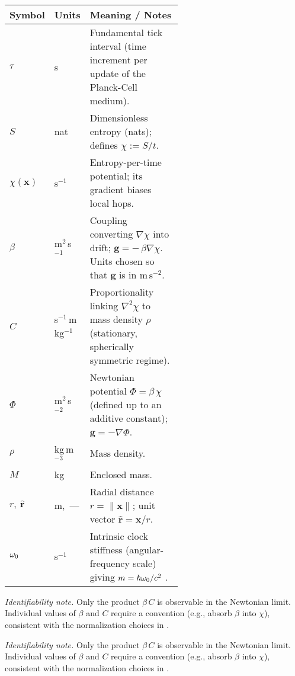 \documentclass[11pt,oneside]{article}
\begin{document}
\begin{table}[!htbp]
\centering
\small
\renewcommand{\arraystretch}{1.2}
\begin{tabular}{@{} l l >{\raggedright\arraybackslash}p{0.58\linewidth} @{}}
\hline
\textbf{Symbol} & \textbf{Units} & \textbf{Meaning / Notes} \\
\hline
$\tau$ & s & Fundamental tick interval (time increment per update of the Planck-Cell medium). \\
$S$ & nat & Dimensionless entropy (nats); defines $\chi:=S/t$. \\
$\chi(\mathbf x)$ & s$^{-1}$ & Entropy-per-time potential; its gradient biases local hops. \\
$\beta$ & m$^{2}$\,s$^{-1}$ & Coupling converting $\nabla\chi$ into drift; $\mathbf g=-\,\beta\nabla\chi$. Units chosen so that $\mathbf g$ is in m\,s$^{-2}$. \\
$C$ & s$^{-1}$\,m\,kg$^{-1}$ & Proportionality linking $\nabla^2\chi$ to mass density $\rho$ (stationary, spherically symmetric regime). \\
$\Phi$ & m$^{2}$\,s$^{-2}$ & Newtonian potential $\Phi=\beta\,\chi$ (defined up to an additive constant); $\mathbf g=-\nabla\Phi$. \\
$\rho$ & kg\,m$^{-3}$ & Mass density. \\
$M$ & kg & Enclosed mass. \\
$r,\ \hat{\mathbf r}$ & m,\ — & Radial distance $r=\|\mathbf x\|$; unit vector $\hat{\mathbf r}=\mathbf x/r$. \\
$\omega_0$ & s$^{-1}$ & Intrinsic clock stiffness (angular-frequency scale) giving $m=\hbar\omega_0/c^2$ \cite{langstaff2025_planck_cell_mass}. \\
\hline
\end{tabular}
\end{table}

\noindent\emph{Identifiability note.} Only the product $\beta\,C$ is observable in the Newtonian limit. Individual values of $\beta$ and $C$ require a convention (e.g., absorb $\beta$ into $\chi$), consistent with the normalization choices in \cite{langstaff2025_temporal_relativity_entropy_clock}.


\noindent\emph{Identifiability note.} Only the product $\beta\,C$ is observable in the Newtonian limit. Individual values of $\beta$ and $C$ require a convention (e.g., absorb $\beta$ into $\chi$), consistent with the normalization choices in \cite{langstaff2025_temporal_relativity_entropy_clock}.
\end{document}
